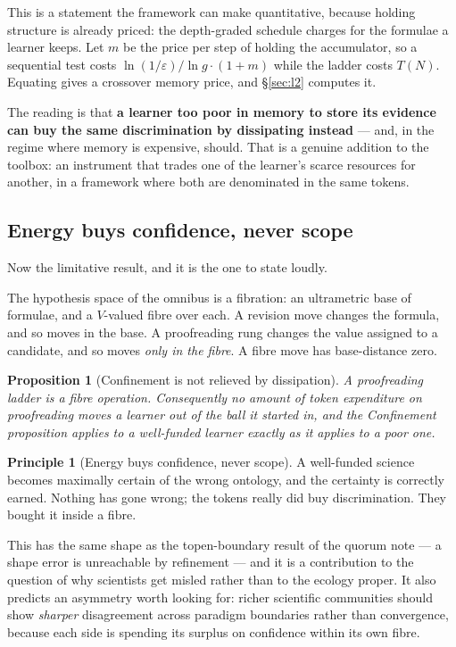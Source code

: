 \documentclass[11pt]{article}
\theoremstyle{plain}
\newtheorem{proposition}[theorem]{Proposition}
\theoremstyle{definition}
\newtheorem{principle}[theorem]{Principle}
\theoremstyle{remark}
\begin{document}
This is a statement the framework can make quantitative, because holding
structure is already priced: the depth-graded schedule charges for the
formulae a learner keeps. Let $m$ be the price per step of holding the
accumulator, so a sequential test costs $\ln(1/\varepsilon)/\ln g \cdot (1+m)$
while the ladder costs $T(N)$. Equating gives a crossover memory price, and
\S\ref{sec:l2} computes it.

The reading is that \textbf{a learner too poor in memory to store its evidence
can buy the same discrimination by dissipating instead} --- and, in the
regime where memory is expensive, should. That is a genuine addition to the
toolbox: an instrument that trades one of the learner's scarce resources for
another, in a framework where both are denominated in the same tokens.

\subsection{Energy buys confidence, never scope}

Now the limitative result, and it is the one to state loudly.

The hypothesis space of the omnibus is a fibration: an ultrametric base of
formulae, and a $V$-valued fibre over each. A revision move changes the
formula, and so moves in the base. A proofreading rung changes the value
assigned to a candidate, and so moves \emph{only in the fibre}. A fibre move
has base-distance zero.

\begin{proposition}[Confinement is not relieved by dissipation]
\label{prop:confinement}
A proofreading ladder is a fibre operation. Consequently no amount of token
expenditure on proofreading moves a learner out of the ball it started in, and
the Confinement proposition applies to a well-funded learner exactly as it
applies to a poor one.
\end{proposition}

\begin{principle}[Energy buys confidence, never scope]
A well-funded science becomes maximally certain of the wrong ontology, and the
certainty is correctly earned. Nothing has gone wrong; the tokens really did
buy discrimination. They bought it inside a fibre.
\end{principle}

This has the same shape as the topen-boundary result of the quorum note --- a
shape error is unreachable by refinement --- and it is a contribution to the
question of why scientists get misled rather than to the ecology proper. It
also predicts an asymmetry worth looking for: richer scientific communities
should show \emph{sharper} disagreement across paradigm boundaries rather than
convergence, because each side is spending its surplus on confidence within
its own fibre.
\end{document}
